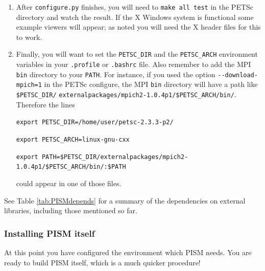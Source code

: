 \documentclass[11pt,final]{amsart}
\begin{document}
\begin{enumerate}
\begin{enumerate}
\item  After \verb|configure.py| finishes, you will need to \verb|make all test| in the PETSc directory and watch the result.  If the X Windows system is functional some example viewers will appear; as noted you will need the X header files for this to work.

\item Finally, you will want to set the \verb|PETSC_DIR| and the \verb|PETSC_ARCH| environment variables in your \verb|.profile| or \verb|.bashrc| file.  Also remember to add the MPI \verb|bin| directory to your \verb|PATH|.  For instance, if you used the option \verb|--download-mpich=1| in the PETSc configure, the MPI \verb|bin| directory will have a path like \verb|$PETSC_DIR/| \verb|externalpackages/mpich2-1.0.4p1/$PETSC_ARCH/bin/|.  Therefore the lines 

\small
\verb|export PETSC_DIR=/home/user/petsc-2.3.3-p2/|

\verb|export PETSC_ARCH=linux-gnu-cxx|

\verb|export PATH=$PETSC_DIR/externalpackages/mpich2-1.0.4p1/$PETSC_ARCH/bin/:$PATH|
\normalsize

\noindent could appear in one of those files.
\end{enumerate}
\end{enumerate}

\medskip
See Table \ref{tab:PISMdepends} for a summary of the dependencies on external libraries, including those mentioned so far.


\subsubsection*{Installing PISM itself}
At this point you have configured the environment which PISM needs.  You are ready to build PISM itself, which is a much quicker procedure!
\end{document}
